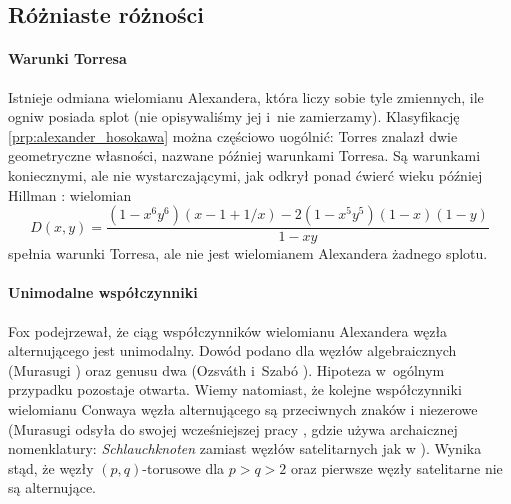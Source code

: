 
\subsection{Różniaste różności}
\paragraph{Warunki Torresa}
Istnieje odmiana wielomianu Alexandera, która liczy sobie tyle zmiennych, ile ogniw posiada splot (nie opisywaliśmy jej i~nie zamierzamy).
Klasyfikację \ref{prp:alexander_hosokawa} można częściowo uogólnić: Torres \cite{torres53} znalazł dwie geometryczne własności, nazwane później warunkami Torresa.
%
%
Są warunkami koniecznymi, ale nie wystarczającymi, jak odkrył ponad ćwierć wieku później Hillman \cite{hillman81}: wielomian
%
\begin{equation}
    D(x,y) = \frac{(1 - x^6y^6)(x - 1 + 1/x) - 2(1 - x^5y^5)(1 - x)(1 - y)}{1-xy}
\end{equation}
spełnia warunki Torresa, ale nie jest wielomianem Alexandera żadnego splotu.

\paragraph{Unimodalne współczynniki}
Fox \cite{fox62} podejrzewał, że
%
%
ciąg współczynników wielomianu Alexandera węzła alternującego jest unimodalny.
Dowód podano dla węzłów algebraicznych (Murasugi \cite{murasugi85}) oraz genusu dwa (Ozsváth i~Szabó \cite{ozsvath03}).
%
%
%
Hipoteza w~ogólnym przypadku pozostaje otwarta.
Wiemy natomiast, że kolejne współczynniki wielomianu Conwaya węzła alternującego są przeciwnych znaków i niezerowe (Murasugi \cite[s. 242]{murasugi96} odsyła do swojej wcześniejszej pracy \cite{murasugi59}, gdzie używa archaicznej nomenklatury: \emph{Schlauchknoten} zamiast węzłów satelitarnych jak w \cite[s. 245]{schubert53}).
%
Wynika stąd, że węzły $(p, q)$-torusowe dla $p > q > 2$ oraz pierwsze węzły satelitarne nie są alternujące.


